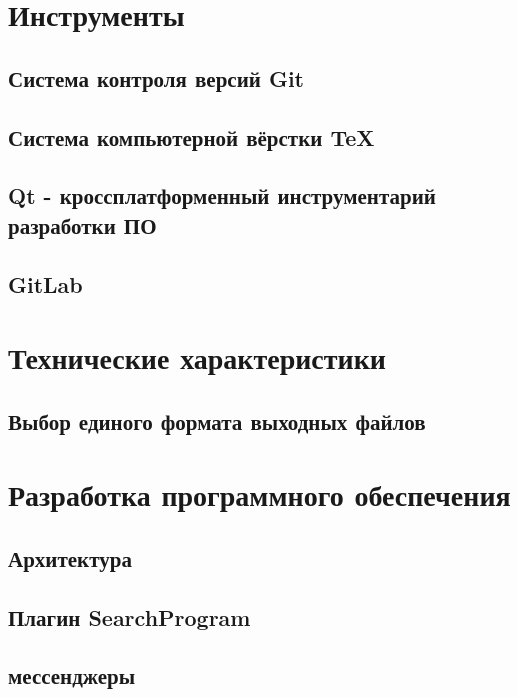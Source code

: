 \section{Инструменты}
\setcounter{figure}{0}
\subsection{Система контроля версий Git}

\subsection{Система компьютерной вёрстки \TeX}

\subsection{Qt - кроссплатформенный инструментарий разработки ПО}

\subsection{GitLab}


\section{Технические характеристики}

\subsection{Выбор единого формата выходных файлов}


\section{Разработка программного обеспечения}
\setcounter{figure}{0}
 
\subsection{Архитектура}


\newpage
\subsection{Плагин SearchProgram} %


\newpage
\subsection{мессенджеры}  %


